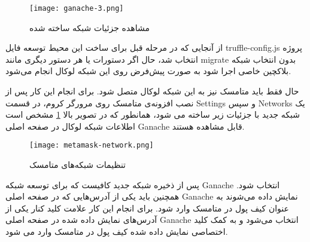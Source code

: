 \begin{figure}[ht]
\centerline{\texttt{[image: ganache-3.png]}}
\caption{مشاهده جزئیات شبکه ساخته شده}
\label{fig:ganache-3}
\end{figure}

از آنجایی که در مرحله قبل برای ساخت این محیط توسعه فایل truffle-config.js پروژه انتخاب شد، حال اگر دستورات
یا هر دستور دیگری مانند migrate بدون انتخاب شبکه بلاکچین خاصی اجرا شود به صورت پیش‌فرض روی این شبکه لوکال انجام می‌شود.

حال فقط باید متامسک نیز به این شبکه لوکال متصل شود. برای انجام این کار پس از نصب افزونه‌ی متامسک روی مرورگر کروم، در قسمت
\gls{Settings}
و سپس
\glspl{Network}
یک شبکه جدید با جزئیات زیر ساخته می شود، همانطور که در تصویر بالا
\ref{fig:ganache-3}
مشخص است اطلاعات شبکه لوکال در صفحه اصلی Ganache قابل مشاهده هستند.

\begin{figure}[ht]
\centerline{\texttt{[image: metamask-network.png]}}
\caption{تنظیمات شبکه‌های متامسک}
\label{fig:metamask-network}
\end{figure}

پس از ذخیره شبکه جدید کافیست که برای توسعه شبکه Ganache انتخاب شود. همچنین باید یکی از آدرس‌هایی که در صفحه اصلی Ganache نمایش داده می‌شوند به عنوان کیف پول در متامسک وارد شود. برای انجام این کار علامت کلید کنار یکی از آدرس‌های نمایش داده شده در صفحه اصلی Ganache انتخاب می‌شود و به کمک کلید اختصاصی نمایش داده شده کیف پول در متامسک وارد می شود.

